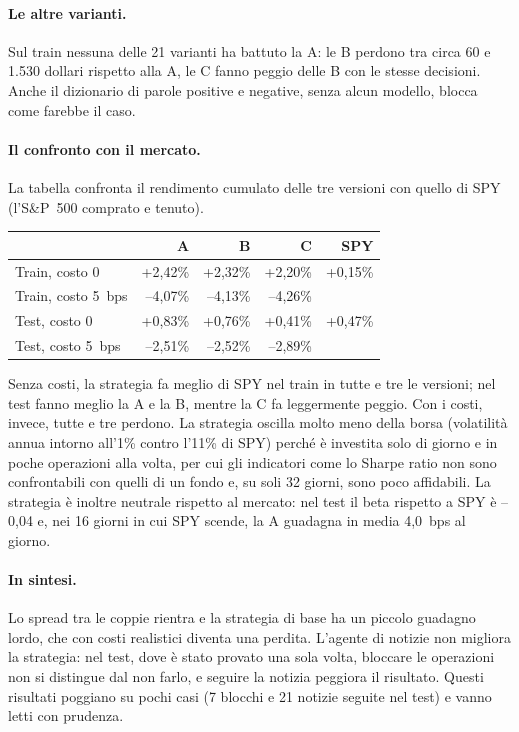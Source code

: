 \documentclass[11pt,a4paper]{article}
\begin{document}
\paragraph{Le altre varianti.} Sul train nessuna delle 21 varianti ha battuto la A: le B perdono tra circa 60 e 1.530 dollari rispetto alla A, le C fanno peggio delle B con le stesse decisioni. Anche il dizionario di parole positive e negative, senza alcun modello, blocca come farebbe il caso.

\paragraph{Il confronto con il mercato.} La tabella confronta il rendimento cumulato delle tre versioni con quello di SPY (l'S\&P~500 comprato e tenuto).
\begin{table}[h]
\centering\small
\begin{tabular}{lrrrr}
\toprule
 & A & B & C & SPY \\
\midrule
Train, costo 0      & +2,42\% & +2,32\% & +2,20\% & +0,15\% \\
Train, costo 5~bps  & --4,07\% & --4,13\% & --4,26\% & \\
Test, costo 0       & +0,83\% & +0,76\% & +0,41\% & +0,47\% \\
Test, costo 5~bps   & --2,51\% & --2,52\% & --2,89\% & \\
\bottomrule
\end{tabular}
\end{table}
Senza costi, la strategia fa meglio di SPY nel train in tutte e tre le versioni; nel test fanno meglio la A e la B, mentre la C fa leggermente peggio. Con i costi, invece, tutte e tre perdono. La strategia oscilla molto meno della borsa (volatilità annua intorno all'1\% contro l'11\% di SPY) perché è investita solo di giorno e in poche operazioni alla volta, per cui gli indicatori come lo Sharpe ratio non sono confrontabili con quelli di un fondo e, su soli 32 giorni, sono poco affidabili. La strategia è inoltre neutrale rispetto al mercato: nel test il beta rispetto a SPY è --0,04 e, nei 16 giorni in cui SPY scende, la A guadagna in media 4,0~bps al giorno.

\paragraph{In sintesi.} Lo spread tra le coppie rientra e la strategia di base ha un piccolo guadagno lordo, che con costi realistici diventa una perdita. L'agente di notizie non migliora la strategia: nel test, dove è stato provato una sola volta, bloccare le operazioni non si distingue dal non farlo, e seguire la notizia peggiora il risultato. Questi risultati poggiano su pochi casi (7 blocchi e 21 notizie seguite nel test) e vanno letti con prudenza.
\end{document}
